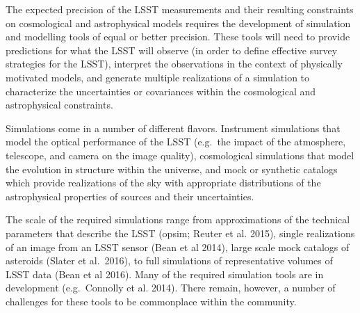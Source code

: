 \documentclass{iau}
\begin{document}
The expected precision of the LSST measurements and their resulting
constraints on cosmological and astrophysical models requires the
development of simulation and modelling tools of equal or better
precision. These tools will need to provide predictions for what the LSST
will observe (in order to define effective survey strategies for the
LSST),  interpret the observations in the context of physically
motivated models, and generate multiple realizations of a simulation
to characterize the uncertainties or covariances within the
cosmological and astrophysical constraints.

Simulations come in a number of different flavors. Instrument
simulations that model the optical performance of the LSST (e.g.\ the
impact of the atmosphere, telescope, and camera on the image quality),
cosmological simulations that model the evolution in structure within
the universe, and mock or synthetic catalogs which provide
realizations of the sky with appropriate distributions of the
astrophysical properties of sources and their uncertainties.

The scale of the required simulations range from approximations of the
technical parameters that describe the LSST (opsim; Reuter et
al. 2015), single realizations of an image from an LSST sensor (Bean
et al 2014), large scale mock catalogs of asteroids (Slater et al.\
2016), to full simulations of representative volumes of LSST data
(Bean et al 2016). Many of the required simulation tools are in
development (e.g.\ Connolly et al. 2014). There remain, however, a
number of challenges for these tools to be commonplace within the
community.
\end{document}
